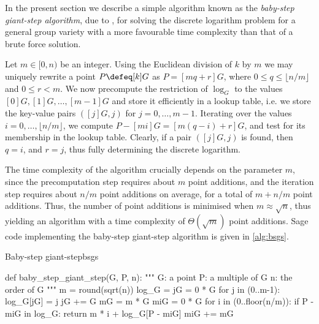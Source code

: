 
In the present section we describe a simple algorithm known as the \emph{baby-step giant-step algorithm}, due to \citep{Shanks}, for solving the discrete logarithm problem for a general group variety with a more favourable time complexity than that of a brute force solution. %

Let $m \in [0, n)$ be an integer. Using the Euclidean division of $k$ by $m$ we may uniquely rewrite a point $P \defeq [k] G$ as $P = [mq + r] G$, where $0 \leq q \leq \lfloor n / m \rfloor$ and $0 \leq r < m$. We now precompute the restriction of $\log_G$ to the values $[0] G, [1] G, \ldots, [m - 1] G$ and store it efficiently in a lookup table, i.e. we store the key-value pairs $([j] G, j)$ for $j = 0, \ldots, m - 1$. Iterating over the values $i = 0, \ldots, \lfloor n / m \rfloor$, we compute $P - [mi] G = [m(q-i) + r] G$, and test for its membership in the lookup table. Clearly, if a pair $([j] G, j)$ is found, then $q = i$, and $r = j$, thus fully determining the discrete logarithm.

The time complexity of the algorithm crucially depends on the parameter $m$, since the precomputation step requires about $m$ point additions, and the iteration step requires about $n / m$ point additions on average, for a total of $m + n / m$ point additions. Thus, the number of point additions is minimised when $m \approx \sqrt{n}$, thus yielding an algorithm with a time complexity of $\Theta(\sqrt{m})$ point additions. Sage code implementing the baby-step giant-step algorithm is given in \cref{alg:bsgs}.

\begin{alg}{Baby-step giant-step}{bsgs}
\begin{sagecode}
def baby_step_giant_step(G, P, n):
    """
    G: a point
    P: a multiple of G
    n: the order of G
    """
    m = round(sqrt(n))
    log_G = {}
    jG = 0 * G
    for j in (0..m-1):
        log_G[jG] = j
        jG += G
    mG = m * G
    miG = 0 * G
    for i in (0..floor(n/m)):
        if P - miG in log_G:
            return m * i + log_G[P - miG]
        miG += mG
\end{sagecode}
\end{alg}

